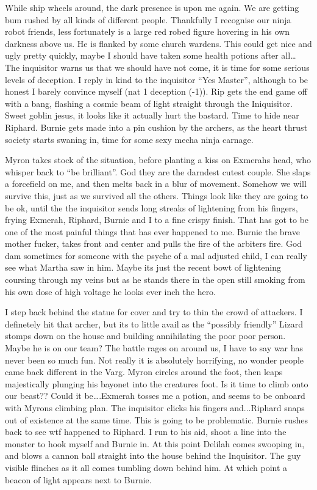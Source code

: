 While ship wheels around, the dark presence is upon me again. We are getting bum rushed by all kinds of different people. Thankfully I recognise our ninja robot friends, less fortunately is a large red robed figure hovering in his own darkness above us. He is flanked by some church wardens. This could get nice and ugly pretty quickly, maybe I should have taken some health potions after all… The inquisitor warns us that we should have not come, it is time for some serious levels of deception. I reply in kind to the inquisitor “Yes Master”, although to be honest I barely convince myself (nat 1 deception (-1)). Rip gets the end game off with a bang, flashing a cosmic beam of light straight through the Iniquisitor. Sweet goblin jesus, it looks like it actually hurt the bastard. Time to hide near Riphard. Burnie gets made into a pin cushion by the archers, as the heart thrust society starts swaning in, time for some sexy mecha ninja carnage.\medskip

Myron takes stock of the situation, before planting a kiss on Exmerahs head, who whisper back to “be brilliant”. God they are the darndest cutest couple. She slaps a forcefield on me, and then melts back in a blur of movement. Somehow we will survive this, just as we survived all the others. Things look like they are going to be ok, until the the inquisitor sends long streaks of lightening from his fingers, frying Exmerah, Riphard, Burnie and I to a fine crispy finish. That has got to be one of the most painful things that has ever happened to me. Burnie the brave mother fucker, takes front and center and pulls the fire of the arbiters fire. God dam sometimes for someone with the psyche of a mal adjusted child, I can really see what Martha saw in him. Maybe its just the recent bowt of lightening coursing through my veins but as he stands there in the open still smoking from his own dose of high voltage he looks ever inch the hero.\medskip

I step back behind the statue for cover and try to thin the crowd of attackers. I definetely hit that archer, but its to little avail as the “possibly friendly” Lizard stomps down on the house and building annihilating the poor poor person. Maybe he is on our team? The battle rages on around us, I have to say war has never been so much fun. Not really it is absolutely horrifying, no wonder people came back different in the Varg. Myron circles around the foot, then leaps majestically plunging his bayonet into the creatures foot. Is it time to climb onto our beast?? Could it be….Exmerah tosses me a potion, and seems to be onboard with Myrons climbing plan. The inquisitor clicks his fingers and...Riphard snaps out of existence at the same time. This is going to be problematic. Burnie rushes back to see wtf happened to Riphard. I run to his aid, shoot a line into the monster to hook myself and Burnie in. At this point Delilah comes swooping in, and blows a cannon ball straight into the house behind the Inquisitor. The guy visible flinches as it all comes tumbling down behind him. At which point a beacon of light appears next to Burnie.\medskip

